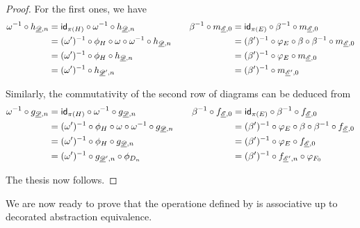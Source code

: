 \begin{proof}
		For the first ones, we have
		\[
		\begin{split} 
			\omega^{-1} \circ h_{\underline{\mathscr{D}}, n}&=\mathsf{id}_{\pi(H)}\circ \omega^{-1} \circ h_{\underline{\mathscr{D}}, n} \\&=(\omega')^{-1}\circ \phi_H \circ \omega \circ \omega^{-1} \circ h_{\underline{\mathscr{D}}, n}\\&=(\omega')^{-1}\circ \phi_H  \circ h_{\underline{\mathscr{D}}, n}\\&=(\omega')^{-1}  \circ h_{\underline{\mathscr{D}}', n}
		\end{split} \qquad  	\begin{split} 
			\beta^{-1} \circ m_{\underline{\mathscr{E}}, 0}&=\mathsf{id}_{\pi(E)}\circ \beta^{-1} \circ m_{\underline{\mathscr{E}}, 0}\\&=(\beta')^{-1}\circ \varphi_{E} \circ \beta \circ \beta^{-1} \circ m_{\underline{\mathscr{E}}, 0}\\&=(\beta')^{-1}\circ \varphi_{E}  \circ m_{\underline{\mathscr{E}}, 0}\\&=(\beta')^{-1}  \circ m_{\underline{\mathscr{E}}', 0}
		\end{split}  \]
		
		Similarly, the commutativity of the second row of diagrams can be deduced from
		\[\begin{split}
			\omega^{-1} \circ g_{\underline{\mathscr{D}}, n}&=\mathsf{id}_{\pi(H)}\circ \omega^{-1} \circ g_{\underline{\mathscr{D}}, n}\\&=(\omega')^{-1}\circ \phi_H \circ \omega\circ \omega^{-1} \circ g_{\underline{\mathscr{D}}, n}\\&=(\omega')^{-1}\circ \phi_H  \circ g_{\underline{\mathscr{D}}, n}\\&= (\omega')^{-1} \circ g_{\underline{\mathscr{D}}', n}\circ \phi_{D_n}
		\end{split}\qquad \begin{split}\beta^{-1} \circ f_{\underline{\mathscr{E}}, 0}&=\mathsf{id}_{\pi(E)}\circ \beta^{-1} \circ f_{\underline{\mathscr{E}}, 0}\\&=(\beta')^{-1}\circ \varphi_E \circ \beta\circ \beta^{-1} \circ f_{\underline{\mathscr{E}}, 0}\\&=(\beta')^{-1}\circ \varphi_E  \circ f_{\underline{\mathscr{E}}, 0}\\&= (\beta')^{-1} \circ f_{\underline{\mathscr{E}}', n}\circ \varphi_{F_0}
		\end{split}\]
		
		The thesis now follows.	
\end{proof}

We are now ready to prove that the operatione defined by  is associative up to decorated abstraction equivalence.

